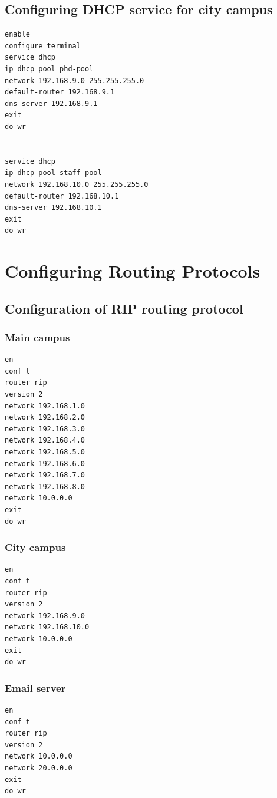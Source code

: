 \documentclass[12pt]{article}
\begin{document}
\subsection{Configuring DHCP service for city campus }
\begin{verbatim}
enable
configure terminal
service dhcp
ip dhcp pool phd-pool
network 192.168.9.0 255.255.255.0
default-router 192.168.9.1
dns-server 192.168.9.1
exit
do wr


service dhcp
ip dhcp pool staff-pool
network 192.168.10.0 255.255.255.0
default-router 192.168.10.1
dns-server 192.168.10.1
exit
do wr
\end{verbatim}













\section{Configuring Routing Protocols}
\subsection{Configuration of RIP routing protocol}
\subsubsection{Main campus}
\begin{verbatim}
en 
conf t
router rip
version 2
network 192.168.1.0
network 192.168.2.0
network 192.168.3.0
network 192.168.4.0
network 192.168.5.0
network 192.168.6.0
network 192.168.7.0
network 192.168.8.0
network 10.0.0.0
exit
do wr
\end{verbatim}
\subsubsection{City campus}
\begin{verbatim}
en 
conf t
router rip
version 2
network 192.168.9.0
network 192.168.10.0
network 10.0.0.0
exit
do wr
\end{verbatim}
\subsubsection{Email server}
\begin{verbatim}
en 
conf t
router rip
version 2
network 10.0.0.0
network 20.0.0.0
exit
do wr
\end{verbatim}
\end{document}
